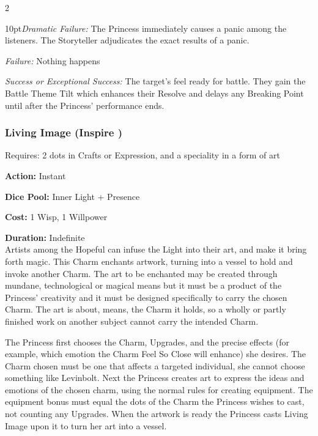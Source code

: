 \begin{multicols}{2}
\begin{myindentpar}{10pt}\emph{Dramatic Failure:} The Princess immediately causes a panic among the listeners. The Storyteller adjudicates the exact results of a panic. 
 
 \emph{Failure:} Nothing happens
 
 \emph{Success or Exceptional Success:} The target's feel ready for battle. They gain the Battle Theme Tilt which enhances their Resolve and delays any Breaking Point until after the Princess' performance ends.  
 
 \end{myindentpar}

\subsubsection*{Living Image (Inspire \textbullet)}

\noindent Requires: 2 dots in Crafts or Expression, and a speciality in a form of art

\noindent \textbf{Action:} Instant

\noindent \textbf{Dice Pool:} Inner Light + Presence 

\noindent \textbf{Cost:} 1 Wisp, 1 Willpower

\noindent \textbf{Duration:} Indefinite\\

\noindent Artists among the Hopeful can infuse the Light into their art, and make it bring forth magic. This Charm enchants artwork, turning into a vessel to hold and invoke another Charm. The art to be enchanted may be created through mundane, technological or magical means but it must be a product of the Princess' creativity and it must be designed specifically to carry the chosen Charm. The art is about, means, the Charm it holds, so a wholly or partly finished work on another subject cannot carry the intended Charm.

The Princess first chooses the Charm, Upgrades, and  the precise effects (for example, which emotion the Charm Feel So Close will enhance) she desires. The Charm chosen must be one that affects a targeted individual, she cannot choose something like Levinbolt. Next the Princess creates art to express the ideas and emotions of the chosen charm, using the normal rules for creating equipment. The equipment bonus must equal the dots of the Charm the Princess wishes to cast, not counting any Upgrades. When the artwork is ready the Princess casts Living Image upon it to turn her art into a vessel. 



\end{multicols}
